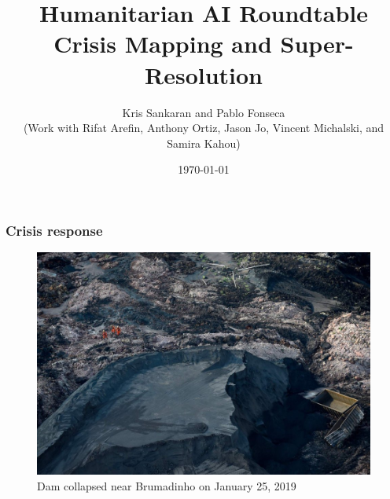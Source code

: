\documentclass[10pt,mathserif]{beamer}
\title{\large \bfseries Humanitarian AI Roundtable \\ Crisis Mapping and Super-Resolution}
\author{Kris Sankaran and Pablo Fonseca\\ (Work with Rifat Arefin, Anthony
  Ortiz, Jason Jo, Vincent Michalski, and Samira Kahou)}
\date{\today}
\begin{document}
\maketitle



\begin{frame}
   \frametitle{Crisis response}
  \begin{figure}[ht]
    \centering
    \includegraphics[width=0.6\paperwidth]{figures/brazil_dam_failure.jpg}
    \caption{Dam collapsed near Brumadinho on January 25, 2019}
  \end{figure}
\end{frame}
\end{document}
